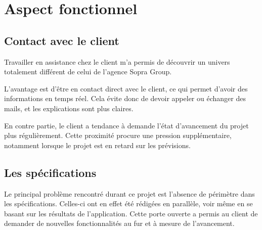 \section{Aspect fonctionnel}


\subsection{Contact avec le client}

Travailler en assistance chez le client m'a permis de découvrir un univers totalement différent de celui de l'agence Sopra Group.

L'avantage est d'être en contact direct avec le client, ce qui permet d'avoir des informations en temps réel. Cela évite donc de devoir appeler ou échanger des mails, et les explications sont plus claires.

En contre partie, le client a tendance à demande l'état d'avancement du projet plus régulièrement.
Cette proximité procure une pression supplémentaire, notamment lorsque le projet est en retard sur les prévisions.


\subsection{Les spécifications}

Le principal problème rencontré durant ce projet est l'absence de périmètre dans les spécifications.
Celles-ci ont en effet été rédigées en parallèle, voir même en se basant sur les résultats de l'application.
Cette porte ouverte a permis au client de demander de nouvelles fonctionnalités au fur et à mesure de l'avancement.
